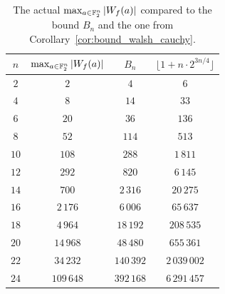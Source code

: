 \documentclass[11pt]{llncs}
\begin{document}

\begin{table}
	\centering
	\begin{tabular}{|c|c|c|c|}
		\hline
		$n$ & $\max_{a\in\mathbb{F}_2^n}|W_f(a)|$ & $B_n$  & $\lfloor 1+n \cdot 2^{3n/4} \rfloor$\\ \hline
		$2$  & $2$     & $4$  &  $6$ \\
		$4$  & $8$     & $14$  & $33$  \\
		$6$  & $20$    & $36$   & $136$\\
		$8$  & $52$    & $114$  & $513$ \\
		$10$ & $108$   & $288$  & $1\,811$\\
		$12$ & $292$   & $820$  & $6\,145$ \\
		$14$ & $700$   & $2\,316$ & $20\,275$ \\
		$16$ & $2\,176$  & $6\,006$ & $65\,637$ \\
		$18$ & $4\,964$  & $18\,192$ & $208\,535$ \\
		$20$ & $14\,968$ & $48\,480$ & $655\,361$ \\
		$22$ & $34\,232$ & $140\,392$ & $2\,039 \,002$ \\
		$24$ & $109\,648$ & $392\,168$ & $6\,291 \,457$  \\ \hline
	\end{tabular}
	\caption{The actual $\max_{a\in\mathbb{F}_2^n}|W_f(a)|$ compared to the bound $B_n$ and the one from Corollary~\ref{cor:bound_walsh_cauchy}.}
	\label{table:max_walsh_vs_bound}
\end{table}
\end{document}
